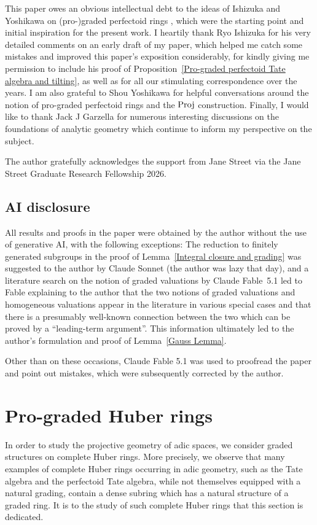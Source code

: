 \documentclass[12pt,twoside,a4paper]{article}
\theoremstyle{definition}
\theoremstyle{remark}
\newcommand\Proj{{\rm Proj}}
\begin{document}
This paper owes an obvious intellectual debt to the ideas of Ishizuka and Yoshikawa on (pro-)graded perfectoid rings \cite{Ishizuka-Yoshikawa25}, which were the starting point and initial inspiration for the present work. I heartily thank Ryo Ishizuka for his very detailed comments on an early draft of my paper, which helped me catch some mistakes and improved this paper's exposition considerably, for kindly giving me permission to include his proof of Proposition~\ref{Pro-graded perfectoid Tate algebra and tilting}, as well as for all our stimulating correspondence over the years. I am also grateful to Shou Yoshikawa for helpful conversations around the notion of pro-graded perfectoid rings and the $\Proj$ construction. Finally, I would like to thank Jack J Garzella for numerous interesting discussions on the foundations of analytic geometry which continue to inform my perspective on the subject. 

The author gratefully acknowledges the support from Jane Street via the Jane Street Graduate Research Fellowship 2026. 

\subsection{AI disclosure}All results and proofs in the paper were obtained by the author without the use of generative AI, with the following exceptions: The reduction to finitely generated subgroups in the proof of Lemma~\ref{Integral closure and grading} was suggested to the author by Claude Sonnet (the author was lazy that day), and a literature search on the notion of graded valuations by Claude Fable~5.1 led to Fable explaining to the author that the two notions of graded valuations and homogeneous valuations appear in the literature in various special cases and that there is a presumably well-known connection between the two which can be proved by a ``leading-term argument''. This information ultimately led to the author's formulation and proof of Lemma~\ref{Gauss Lemma}. 

Other than on these occasions, Claude Fable 5.1 was used to proofread the paper and point out mistakes, which were subsequently corrected by the author.    

\section{Pro-graded Huber rings}\label{sec:Huber rings}

In order to study the projective geometry of adic spaces, we consider graded structures on complete Huber rings. More precisely, we observe that many examples of complete Huber rings occurring in adic geometry, such as the Tate algebra and the perfectoid Tate algebra, while not themselves equipped with a natural grading, contain a dense subring which has a natural structure of a graded ring. It is to the study of such complete Huber rings that this section is dedicated.
\end{document}

